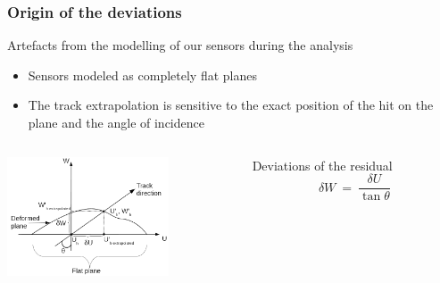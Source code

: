 \documentclass{beamer}
\begin{document}
\begin{frame}
  \frametitle{Origin of the deviations}
  
  \begin{block}{Artefacts from the modelling of our sensors during the analysis}
    \begin{itemize}
      \item Sensors modeled as completely flat planes
      \item The track extrapolation is sensitive to the exact position of the hit on the plane and the angle of incidence
    \end{itemize}
  \end{block}

  \begin{columns}[c]
    \begin{column}{5cm}
      \vspace{-0.2cm}
      \begin{center}
        \includegraphics[width = 4.8cm]{Pictures/origin_deformation.png}
      \end{center}
    \end{column}

    \begin{column}{5cm}
      \begin{alertblock}{Deviations of the residual}
        \[ \delta W \ = \ \frac{\delta U}{\tan \theta}\]
      \end{alertblock}
    \end{column}
  \end{columns}

\end{frame}
\end{document}
